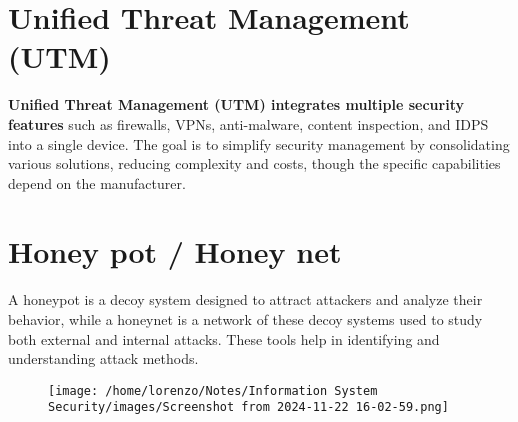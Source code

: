\section{Unified Threat Management (UTM)}
\textbf{Unified Threat Management (UTM) integrates multiple security features} such as firewalls, VPNs, anti-malware, content inspection, and IDPS into a single device. The goal is to simplify security management by consolidating various solutions, reducing complexity and costs, though the specific capabilities depend on the manufacturer.

\section{Honey pot / Honey net}
A honeypot is a decoy system designed to attract attackers and analyze their behavior, while a honeynet is a network of these decoy systems used to study both external and internal attacks. These tools help in identifying and understanding attack methods.
\begin{figure}[h]
    \centering
    \texttt{[image: /home/lorenzo/Notes/Information System Security/images/Screenshot from 2024-11-22 16-02-59.png]}
\end{figure}




